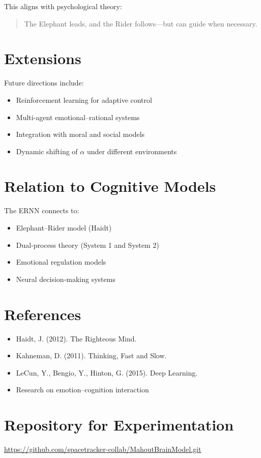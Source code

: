 \documentclass[12pt]{article}
\begin{document}
This aligns with psychological theory:

\begin{quote}
The Elephant leads, and the Rider follows—but can guide when necessary.
\end{quote}

\section{Extensions}

Future directions include:

\begin{itemize}
\item Reinforcement learning for adaptive control
\item Multi-agent emotional–rational systems
\item Integration with moral and social models
\item Dynamic shifting of $\alpha$ under different environments
\end{itemize}

\section{Relation to Cognitive Models}

The ERNN connects to:

\begin{itemize}
\item Elephant–Rider model (Haidt)
\item Dual-process theory (System 1 and System 2)
\item Emotional regulation models
\item Neural decision-making systems
\end{itemize}

\section{References}

\begin{itemize}
\item Haidt, J. (2012). The Righteous Mind.
\item Kahneman, D. (2011). Thinking, Fast and Slow.
\item LeCun, Y., Bengio, Y., Hinton, G. (2015). Deep Learning.
\item Research on emotion–cognition interaction
\end{itemize}

\section{Repository for Experimentation}

\noindent
\url{https://github.com/spacetracker-collab/MahoutBrainModel.git}
\end{document}
